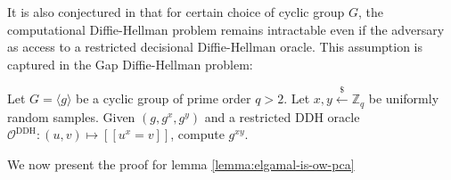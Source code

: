 \documentclass[journal=tches,submission]{iacrtrans}
\newcommand{\leftsample}{\stackrel{\$}{\leftarrow}}
\newcommand{\llbrack}{[\![}
\newcommand{\rrbrack}{]\!]}
\begin{document}
It is also conjectured in \cite{DBLP:conf/ctrsa/AbdallaBR01} that for certain choice of cyclic group $G$, the computational Diffie-Hellman problem remains intractable even if the adversary as access to a restricted decisional Diffie-Hellman oracle. This assumption is captured in the Gap Diffie-Hellman problem:

\begin{definition}
    Let $G = \langle g \rangle$ be a cyclic group of prime order $q > 2$. Let $x, y \leftsample \mathbb{Z}_q$ be uniformly random samples. Given $(g, g^x, g^y)$ and a restricted DDH oracle $\mathcal{O}^\text{DDH}: (u, v) \mapsto \llbrack u^x = v \rrbrack$, compute $g^{xy}$.
\end{definition}

We now present the proof for lemma \ref{lemma:elgamal-is-ow-pca}
\end{document}

